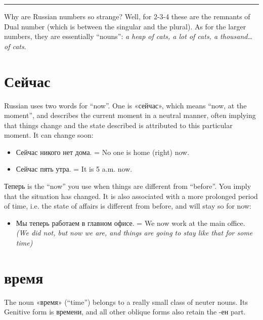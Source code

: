 \begin{center}\rule{0.5\linewidth}{\linethickness}\end{center}

Why are Russian numbers so strange? Well, for 2-3-4 these are the
remnants of Dual number (which is between the singular and the plural).
As for the larger numbers, they are essentially ``nouns'': \emph{a heap
of cats, a lot of cats, a thousand\ldots{} of cats}.

\section{Сейчас}\label{ux441ux435ux439ux447ux430ux441}

Russian uses two words for ``now''. One is «сейчас», which means ``now,
at the moment'', and describes the current moment in a neutral manner,
often implying that things change and the state described is attributed
to this particular moment. It can change soon:

\begin{itemize}
\tightlist
\item
  Сейчас никого нет дома. = No one is home (right) now.
\item
  Сейчас пять утра. = It is 5 a.m. now.
\end{itemize}

Теперь is the ``now'' you use when things are different from ``before''.
You imply that the situation has changed. It is also associated with a
more prolonged period of time, i.e. the state of affairs is different
from before, and will stay so for now:

\begin{itemize}
\tightlist
\item
  Мы теперь работаем в главном офисе. = We now work at the main office.
  \emph{(We did not, but now we are, and things are going to stay like
  that for some time)}
\end{itemize}

\section{время}\label{ux432ux440ux435ux43cux44f}

The noun «время» (``time'') belongs to a really small class of neuter
nouns. Its Genitive form is времени, and all other oblique forms also
retain the -ен part.
